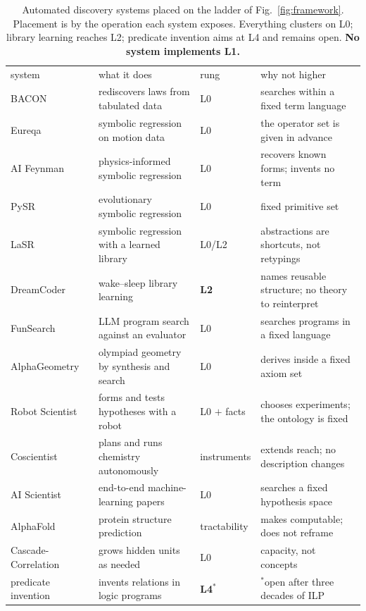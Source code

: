 \documentclass[aps,pra,twocolumn,superscriptaddress,nofootinbib,10pt]{revtex4-2}
\begin{document}
\begin{table}[t]
\caption{Automated discovery systems placed on the ladder of Fig.~\ref{fig:framework}. Placement
is by the operation each system exposes. Everything clusters on L0; library learning reaches L2;
predicate invention aims at L4 and remains open. \textbf{No system implements L1.}}
\label{tab:prior}
\begin{ruledtabular}
\footnotesize
\begin{tabular}{llll}
system & what it does & rung & why not higher \\
\colrule
BACON~\cite{langley1981bacon} & rediscovers laws from tabulated data & L0 & searches within a fixed term language \\
Eureqa~\cite{schmidt2009eureqa} & symbolic regression on motion data & L0 & the operator set is given in advance \\
AI Feynman~\cite{udrescu2020feynman} & physics-informed symbolic regression & L0 & recovers known forms; invents no term \\
PySR~\cite{cranmer2023pysr} & evolutionary symbolic regression & L0 & fixed primitive set \\
LaSR~\cite{grayeli2024lasr} & symbolic regression with a learned library & L0/L2 & abstractions are shortcuts, not retypings \\
DreamCoder~\cite{ellis2021dreamcoder} & wake--sleep library learning & \textbf{L2} & names reusable structure; no theory to reinterpret \\
FunSearch~\cite{romeraparedes2024funsearch} & LLM program search against an evaluator & L0 & searches programs in a fixed language \\
AlphaGeometry~\cite{trinh2024alphageometry} & olympiad geometry by synthesis and search & L0 & derives inside a fixed axiom set \\
Robot Scientist~\cite{king2004robot} & forms and tests hypotheses with a robot & L0 $+$ facts & chooses experiments; the ontology is fixed \\
Coscientist~\cite{boiko2023coscientist} & plans and runs chemistry autonomously & instruments & extends reach; no description changes \\
AI Scientist~\cite{lu2024aiscientist} & end-to-end machine-learning papers & L0 & searches a fixed hypothesis space \\
AlphaFold~\cite{jumper2021alphafold} & protein structure prediction & tractability & makes computable; does not reframe \\
Cascade-Correlation~\cite{fahlman1990cascor} & grows hidden units as needed & L0 & capacity, not concepts \\
predicate invention~\cite{cropper2022ilp} & invents relations in logic programs & \textbf{L4}$^{*}$ & $^{*}$open after three decades of ILP \\
\end{tabular}
\end{ruledtabular}
\end{table}
\end{document}
